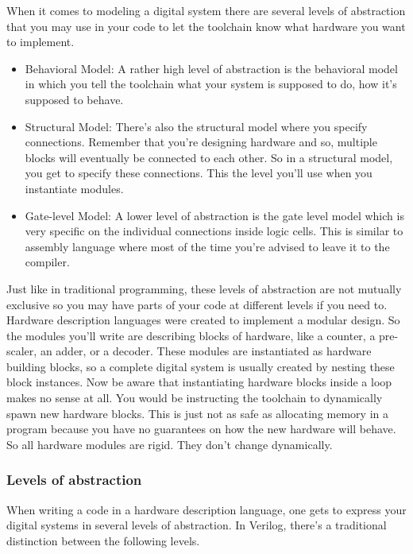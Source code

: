 When it comes to modeling a digital system there are several levels of abstraction that you may use in your code to let the toolchain know what hardware you want to implement. 

\begin{itemize}
	\item Behavioral Model: A rather high level of abstraction is the behavioral model in which you tell the toolchain what your system is supposed to do, how it's supposed to behave. 
	
	\item Structural Model: There's also the structural model where you specify connections. Remember that you're designing hardware and so, multiple blocks will eventually be connected to each other. So in a structural model, you get to specify these connections. This the level you'll use when you instantiate modules.
	
	\item Gate-level Model: A lower level of abstraction is the gate level model which is very specific on the individual connections inside logic cells. This is similar to assembly language where most of the time you're advised to leave it to the compiler. 
	
\end{itemize}

Just like in traditional programming, these levels of abstraction are not mutually exclusive so you may have parts of your code at different levels if you need to. Hardware description languages were created to implement a modular design. So the modules you'll write are describing blocks of hardware, like a counter, a pre-scaler, an adder, or a decoder. These modules are instantiated as hardware building blocks, so a complete digital system is usually created by nesting these block instances. Now be aware that instantiating hardware blocks inside a loop makes no sense at all. You would be instructing the toolchain to dynamically spawn new hardware blocks. This is just not as safe as allocating memory in a program because you have no guarantees on how the new hardware will behave. So all hardware modules are rigid. They don't change dynamically.

\subsubsection{Levels of abstraction}
When writing a code in a hardware description language, one gets to express your digital systems in several levels of abstraction. In Verilog, there's a traditional distinction between the following levels. 

